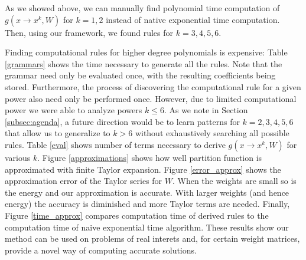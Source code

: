 As we showed above, we can manually find
polynomial time computation of $g(x \rightarrow x^k, W)$ for $k = 1, 2$
instead of native exponential time computation. Then, using our
framework, we found rules for $k = 3, 4, 5, 6$.  


Finding computational rules for higher degree
polynomials is expensive: Table \ref{grammars} shows the time
necessary to generate all the rules. Note that the grammar
need only be evaluated once, with the resulting coefficients being
stored. Furthermore, the process of discovering the computational rule
for a given power also need only be performed once. However, due to limited computational
power we were able to analyze powers $k \leq 6$. As we note in Section
\ref{subsec:agenda}, a future direction would be to learn patterns for
$k=2, 3, 4, 5, 6$ that allow us to generalize to $k>6$ without exhaustively
searching all possible rules. 
Table \ref{eval} shows number of terms necessary to derive $g(x
\rightarrow x^k, W)$ for various $k$. Figure \ref{approximations}
shows how well partition function is approximated with finite Taylor
expansion. Figure \ref{error_approx} shows the approximation error of
the Taylor series for $W$. When the weights are small so is the energy
and our approximation is accurate. With larger weights (and hence
energy) the accuracy is diminished and more Taylor terms are needed. Finally,
Figure \ref{time_approx} compares computation time of derived rules to
the computation time of naive exponential time algorithm.
These results show our method can be used on problems of real interets
and, for certain weight matrices, provide a novel way of computing accurate solutions. 


